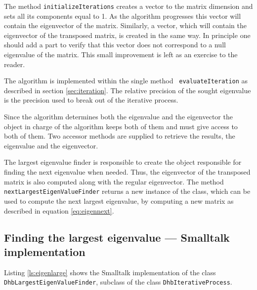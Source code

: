 \documentclass[twoside]{book}
\begin{document}
The method {\tt initializeIterations} creates a vector to the
matrix dimension and sets all its components equal to 1. As the
algorithm progresses this vector will contain the eigenvector of
the matrix. Similarly, a vector, which will contain the
eigenvector of the transposed matrix, is created in the same way.
In principle one should add a part to verify that this vector does
not correspond to a null eigenvalue of the matrix. This small
improvement is left as an exercise to the reader.

The algorithm is implemented within the single method {\tt
evaluateIteration} as described in section \ref{sec:iteration}.
The relative precision of the sought eigenvalue is the precision
used to break out of the iterative process.

Since the algorithm determines both the eigenvalue and the
eigenvector the object in charge of the algorithm keeps both of
them and must give access to both of them. Two accessor methods
are supplied to retrieve the results, the eigenvalue and the
eigenvector.

The largest eigenvalue finder is responsible to create the object
responsible for finding the next eigenvalue when needed. Thus, the
eigenvector of the transposed matrix is also computed along with
the regular eigenvector. The method {\tt
nextLargestEigenValueFinder} returns a new instance of the class,
which can be used to compute the next largest eigenvalue, by
computing a new matrix as described in equation
\ref{eq:eigennext}.

\subsection{Finding the largest eigenvalue --- Smalltalk
implementation} Listing \ref{ls:eigenlarge} shows the Smalltalk
implementation of the  class {\tt DhbLargestEigenValueFinder},
subclass of the class {\tt DhbIterativeProcess}.
\end{document}
